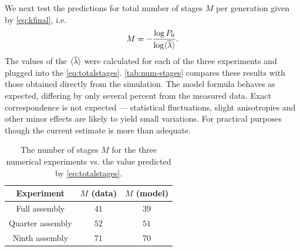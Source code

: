 We next test the predictions for total number of stages $M$ per generation given
by \eqref{eq:kfinal}, i.e.
\begin{equation}
  \label{eq:totalstages}
  M = -\frac{\log P_0}{\log \langle \overline{\lambda} \rangle}.
\end{equation}
The values of the $\langle \overline{\lambda} \rangle$ were calculated for each of the three experiments and
plugged into the \eqref{eq:totalstages}. \autoref{tab:num-stages} compares these
results with those obtained directly from the simulation. The model formula
behaves as expected, differing by only several percent from the measured
data. Exact correspondence is not expected --- statistical fluctuations, slight
anisotropies and other minor effects are likely to yield small variations. For
practical purposes though the current estimate is more than adequate.
\begin{table}[htb]
  \centering
  \begin{tabular}{c c c}
    \toprule
    Experiment & $M$ (data) & $M$ (model)  \\
    \midrule
    Full assembly & $41$ & $39$  \\
    Quarter assembly & $52$ & $51$ \\
    Ninth assembly & $71$ & $70$  \\
    \bottomrule
  \end{tabular}
  \caption{The number of stages $M$ for the three numerical experiments vs. the
    value predicted by \eqref{eq:totalstages}.}
  \label{tab:num-stages}
\end{table}

